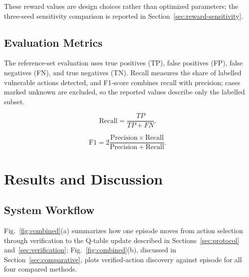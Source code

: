 \documentclass[conference, a4paper]{IEEEtran}
\begin{document}
These reward values are design choices rather than optimized
parameters; the three-seed sensitivity comparison is reported in
Section~\ref{sec:reward-sensitivity}.

\subsection{Evaluation Metrics}

The reference-set evaluation uses true positives (TP), false
positives (FP), false negatives (FN), and true negatives (TN).
Recall measures the share of labelled vulnerable actions detected,
and F1-score combines recall with precision; cases marked unknown
are excluded, so the reported values describe only the labelled
subset.

\begin{equation}
\mathrm{Recall} = \frac{TP}{TP+FN}.
\label{eq:recall}
\end{equation}

\begin{equation}
\mathrm{F1} =
2\frac{\mathrm{Precision}\times\mathrm{Recall}}
{\mathrm{Precision}+\mathrm{Recall}}.
\label{eq:f1}
\end{equation}

\section{Results and Discussion}
\label{sec:results}

\subsection{System Workflow}

Fig.~\ref{fig:combined}(a) summarizes how one episode moves from
action selection through verification to the Q-table update
described in Sections~\ref{sec:protocol}
and~\ref{sec:verification}; Fig.~\ref{fig:combined}(b), discussed in
Section~\ref{sec:comparative}, plots verified-action discovery
against episode for all four compared methods.
\end{document}
